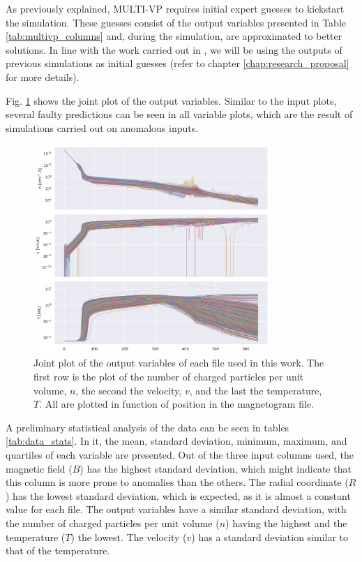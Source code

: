 As previously explained, MULTI-VP requires initial expert guesses to kickstart the simulation. These guesses consist of the output variables presented in Table \ref{tab:multivp_columns} and, during the simulation, are approximated to better solutions. In line with the work carried out in \cite{barros_InitialConditionEstimation_}, we will be using the outputs of previous simulations as initial guesses (refer to chapter \ref{chap:research_proposal} for more details).


Fig. \ref{fig:jointplot_output} shows the joint plot of the output variables. Similar to the input plots, several faulty predictions can be seen in all variable plots, which are the result of simulations carried out on anomalous inputs.

\begin{figure}[h]
    \centering
    \includegraphics[width=0.8\textwidth]{figures/joint_output_cols.png}
    \caption{Joint plot of the output variables of each file used in this work. The first row is the plot of the number of charged particles per unit volume, $n$, the second the velocity, $v$, and the last the temperature, $T$. All are plotted in function of position in the magnetogram file.}
    \label{fig:jointplot_output}
\end{figure}

A preliminary statistical analysis of the data can be seen in tables \ref{tab:data_stats}. In it, the mean, standard deviation, minimum, maximum, and quartiles of each variable are presented. Out of the three input columns used, the magnetic field ($B$) has the highest standard deviation, which might indicate that this column is more prone to anomalies than the others. The radial coordinate ($R$) has the lowest standard deviation, which is expected, as it is almost a constant value for each file. The output variables have a similar standard deviation, with the number of charged particles per unit volume ($n$) having the highest and the temperature ($T$) the lowest. The velocity ($v$) has a standard deviation similar to that of the temperature.


